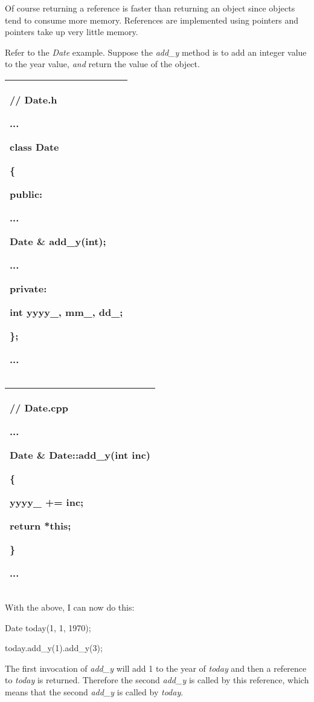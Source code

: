 \documentclass[
]{article}
\begin{document}
Of course returning a reference is faster than returning an object since
objects tend to consume more memory. References are implemented using
pointers and pointers take up very little memory.

Refer to the \emph{Date} example. Suppose the \emph{add\_y} method is to
add an integer value to the year value, \emph{and} return the value of
the object.

\begin{longtable}[]{@{}l@{}}
\toprule
\endhead
\begin{minipage}[t]{0.97\columnwidth}\raggedright
// Date.h

...

class Date

\{

public:

...

\textbf{Date \&} add\_y(int);

...

private:

int yyyy\_, mm\_, dd\_;

\};

...\strut
\end{minipage}\tabularnewline
\bottomrule
\end{longtable}

\begin{longtable}[]{@{}l@{}}
\toprule
\endhead
\begin{minipage}[t]{0.97\columnwidth}\raggedright
// Date.cpp

...

\textbf{Date \&} Date::add\_y(int inc)

\{

yyyy\_ += inc;

\textbf{return *this;}

\}

...\strut
\end{minipage}\tabularnewline
\bottomrule
\end{longtable}

With the above, I can now do this:

Date today(1, 1, 1970);

today.add\_y(1).add\_y(3);

The first invocation of \emph{add\_y} will add 1 to the year of
\emph{today} and then a reference to \emph{today} is returned. Therefore
the second \emph{add\_y} is called by this reference, which means that
the second \emph{add\_y} is called by \emph{today}.
\end{document}
